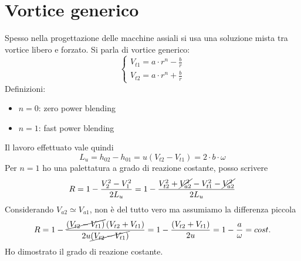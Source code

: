 \section{Vortice generico}
Spesso nella progettazione delle macchine assiali si usa una soluzione mista tra vortice libero e forzato. Si parla di vortice generico:
\begin{equation}
\begin{cases}
V_{t1} = a \cdot r^n - \frac{b}{r}\\
V_{t2} = a \cdot r^n + \frac{b}{r}
\end{cases}
\end{equation}
Definizioni:
\begin{itemize}
\item $n=0$: zero power blending
\item $n=1$: fast power blending
\end{itemize}
Il lavoro effettuato vale quindi 
\begin{equation}
L_u = h_{02} - h_{01} = u \left( V_{t2} - V_{t1} \right) = 2 \cdot b \cdot \omega
\end{equation}
Per $n=1$ ho una palettatura a grado di reazione costante, posso scrivere
\begin{align*}
R = 1 - \frac{V_2^2 - V_1^2}{2 L_u} = 1 - \frac{V_{t2}^2 + \cancel{V_{a2}^2} - V_{t1}^2 - \cancel{V_{a2}^2}}{2 L_u}
\end{align*}
Considerando $V_{a2} \simeq V_{a1}$, non è del tutto vero ma assumiamo la differenza piccola
\begin{align*}
R = 1 - \frac{\cancel{\left( V_{t2} - V_{t1} \right)} \left( V_{t2}+ V_{t1} \right)}{2 u \cancel{\left( V_{t2}- V_{t1} \right)}} = 1- \frac{\left( V_{t2}+ V_{t1} \right)}{2 u} = 1-\frac{a}{\omega} = cost.
\end{align*}
Ho dimostrato il grado di reazione costante.

